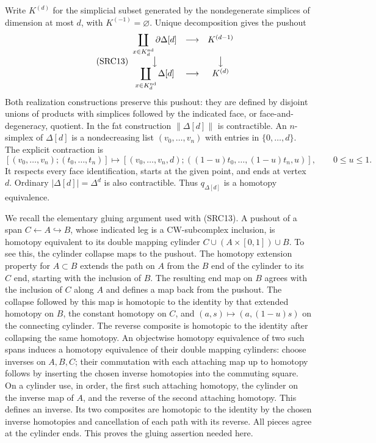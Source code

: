 Write $K^{(d)}$ for the simplicial subset generated by the
nondegenerate simplices of dimension at most $d$, with
$K^{(-1)}=\varnothing$. Unique decomposition gives the pushout
\begin{equation}\tag{SRC13}
\begin{array}{ccc}
\displaystyle\coprod_{x\in K_d^{\rm nd}}\partial\Delta[d]
 &\longrightarrow& K^{(d-1)}\\
\big\downarrow&&\big\downarrow\\
\displaystyle\coprod_{x\in K_d^{\rm nd}}\Delta[d]
 &\longrightarrow& K^{(d)}
\end{array}
\end{equation}
Both realization constructions preserve this pushout: they are
defined by disjoint unions of products with simplices followed by
the indicated face, or face-and-degeneracy, quotient. In the fat
construction $\|\Delta[d]\|$ is contractible. An $n$-simplex of
$\Delta[d]$ is a nondecreasing list $(v_0,\ldots,v_n)$ with entries
in $\{0,\ldots,d\}$. The explicit contraction is
\begin{equation}\tag{SRC14}
[(v_0,\ldots,v_n);(t_0,\ldots,t_n)]
 \longmapsto
[(v_0,\ldots,v_n,d);
       ((1-u)t_0,\ldots,(1-u)t_n,u)],\qquad 0\le u\le1.
\end{equation}
It respects every face identification, starts at the given point,
and ends at vertex $d$. Ordinary $|\Delta[d]|=\Delta^d$ is also
contractible. Thus $q_{\Delta[d]}$ is a homotopy equivalence.

We recall the elementary gluing argument used with (SRC13). A
pushout of a span $C\leftarrow A\hookrightarrow B$, whose indicated
leg is a CW-subcomplex inclusion, is homotopy equivalent to its
double mapping cylinder
$C\cup(A\times[0,1])\cup B$. To see this, the cylinder collapse
maps to the pushout. The homotopy extension property for $A\subset B$
extends the path on $A$ from the $B$ end of the cylinder to its
$C$ end, starting with the inclusion of $B$. The resulting end
map on $B$ agrees with the inclusion of $C$ along $A$ and defines
a map back from the pushout. The collapse followed by this map
is homotopic to the identity by that extended homotopy on $B$,
the constant homotopy on $C$, and
$(a,s)\mapsto(a,(1-u)s)$ on the connecting cylinder. The reverse
composite is homotopic to the identity after collapsing the same
homotopy. An objectwise homotopy equivalence of two such spans
induces a homotopy equivalence of their double mapping cylinders:
choose inverses on $A,B,C$; their commutation with each attaching
map up to homotopy follows by inserting the chosen inverse
homotopies into the commuting square. On a cylinder use, in order,
the first such attaching homotopy, the cylinder on the inverse
map of $A$, and the reverse of the second attaching homotopy.
This defines an inverse. Its two composites are homotopic to the
identity by the chosen inverse homotopies and cancellation of each
path with its reverse. All pieces agree at the cylinder ends.
This proves the gluing assertion needed here.

